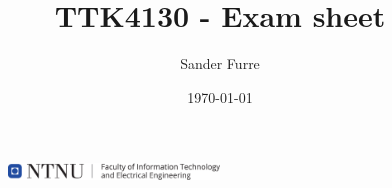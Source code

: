 \documentclass[11pt, a4paper, USenglish]{article}
\begin{document}
\title{TTK4130 - Exam sheet}
\author{Sander Furre}
\date{\today}
\begin{titlepage}
    \maketitle
    \begin{figure}
    \centering
    \includegraphics[width=0.5\textwidth]{figures/misc/ie_logo.pdf}\\
    \end{figure}
    \thispagestyle{empty}
\end{titlepage}


\newpage

\newpage

\newpage

\newpage

\end{document}
